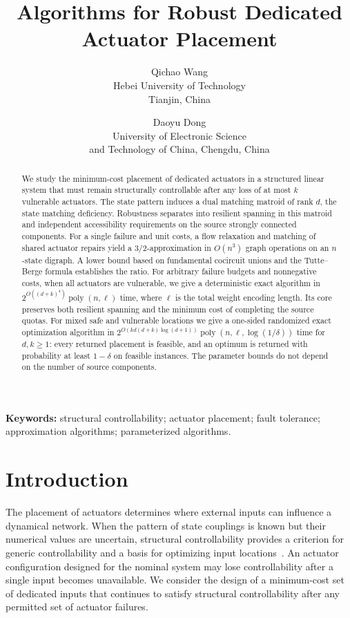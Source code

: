 \documentclass[11pt]{article}
\title{Algorithms for Robust Dedicated Actuator Placement}
\author{Qichao Wang\\
\small Hebei University of Technology\\
\small Tianjin, China
\and
Daoyu Dong\\
\small University of Electronic Science\\
\small and Technology of China, Chengdu, China}
\date{}
\theoremstyle{definition}
\theoremstyle{remark}\newtheorem{remark}[theorem]{Remark}
\begin{document}
\maketitle
\begin{abstract}
We study the minimum-cost placement of dedicated actuators in a
structured linear system that must remain structurally controllable
after any loss of at most $k$ vulnerable actuators. The state pattern
induces a dual matching matroid of rank $d$, the state matching
deficiency. Robustness separates into resilient spanning in this
matroid and independent accessibility requirements on the source
strongly connected components. For a single failure and unit costs,
a flow relaxation and matching of shared actuator repairs yield a
$3/2$-approximation in $O(n^3)$ graph operations on an $n$-state
digraph. A lower bound based on fundamental cocircuit unions and the
Tutte--Berge formula establishes the ratio. For arbitrary failure
budgets and nonnegative costs, when all actuators are vulnerable,
we give a deterministic exact algorithm in
$2^{O((d+k)^4)}\operatorname{poly}(n,\ell)$ time, where $\ell$
is the total weight encoding length. Its core preserves both
resilient spanning and the minimum cost of completing the source
quotas. For mixed safe and vulnerable locations we give a
one-sided randomized exact optimization algorithm in
$2^{O(kd(d+k)\log(d+1))}\operatorname{poly}(n,\ell,\log(1/\delta))$
time for $d,k\ge1$: every returned placement is feasible, and an
optimum is returned with probability at least $1-\delta$ on feasible
instances. The parameter bounds do not depend on the number of
source components.
\end{abstract}

\noindent\textbf{Keywords:} structural controllability; actuator placement;
fault tolerance; approximation algorithms; parameterized algorithms.

\section{Introduction}
The placement of actuators determines where external inputs can
influence a dynamical network. When the pattern of state couplings
is known but their numerical values are uncertain, structural
controllability provides a criterion for generic controllability
and a basis for optimizing input locations~\cite{Lin,PKA,PKAcost}.
An actuator configuration designed for the nominal system may lose
controllability after a single input becomes unavailable. We consider
the design of a minimum-cost set of dedicated inputs that continues
to satisfy structural controllability after any permitted set of
actuator failures.
\end{document}
